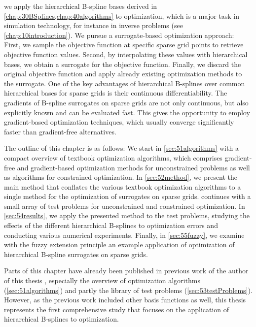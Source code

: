 
\label{chap:50optimization}

we apply the hierarchical B-spline bases derived in
\cref{chap:30BSplines,chap:40algorithms} to optimization,
which is a major task in simulation technology,
for instance in inverse problems (see \cref{chap:10introduction}).
We pursue a surrogate-based optimization approach:
First, we sample the objective function at specific sparse grid points
to retrieve objective function values.
Second, by interpolating these values with hierarchical bases,
we obtain a surrogate for the objective function.
Finally, we discard the original objective function and apply
already existing optimization methods to the surrogate.
One of the key advantages of hierarchical B-splines
over common hierarchical bases for
sparse grids is their continuous differentiability.
The gradients of B-spline surrogates on sparse grids are not only continuous,
but also explicitly known and can be evaluated fast.
This gives the opportunity to employ gradient-based optimization techniques,
which usually converge significantly faster than gradient-free alternatives.

The outline of this chapter is as follows:
We start in \cref{sec:51algorithms}
with a compact overview of textbook optimization algorithms,
which comprises gradient-free and gradient-based optimization methods
for unconstrained problems as well as algorithms for constrained optimization.
In \cref{sec:52method}, we present the main method that
conflates the various textbook optimization algorithms
to a single method for the optimization of surrogates on sparse grids.
 continues with a small array of test problems
for unconstrained and constrained optimization.
In \cref{sec:54results}, we apply the presented method
to the test problems, studying the effects of the different
hierarchical B-splines to optimization errors and conducting various
numerical experiments.
Finally, in \cref{sec:55fuzzy}, we examine with the fuzzy extension principle
an example application of optimization of hierarchical B-spline surrogates on
sparse grids.

Parts of this chapter have already been published in previous work
of the author of this thesis \cite{Valentin14Hierarchische}, especially
the overview of optimization algorithms (\cref{sec:51algorithms})
and partly the library of test problems (\cref{sec:53testProblems}).
However, as the previous work included other basis functions as well,
this thesis represents the first comprehensive study
that focuses on the application of hierarchical B-splines to optimization.







\cleardoublepage
